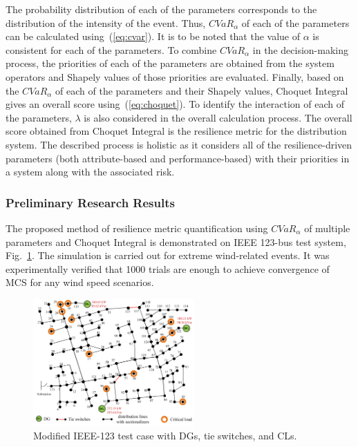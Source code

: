 The probability distribution of each of the parameters corresponds to the distribution of the intensity of the event. Thus, $CVaR_\alpha$ of each of the parameters can be calculated using~(\ref{eq:cvar}). It is to be noted that the value of $\alpha$ is consistent for each of the parameters. To combine $CVaR_\alpha$ in the decision-making process, the priorities of each of the parameters are obtained from the system operators and Shapely values of those priorities are evaluated. Finally, based on the $CVaR_\alpha$ of each of the parameters and their Shapely values, Choquet Integral gives an overall score using~(\ref{eq:choquet}). To identify the interaction of each of the parameters, $\lambda$ is also considered in the overall calculation process. The overall score obtained from Choquet Integral is the resilience metric for the distribution system. The described process is holistic as it considers all of the resilience-driven parameters (both attribute-based and performance-based) with their priorities in a system along with the associated risk.  

\subsubsection{Preliminary Research Results}
The proposed method of resilience metric quantification using $CVaR_\alpha$ of multiple parameters and Choquet Integral is demonstrated on IEEE 123-bus test system, Fig.~\ref{fig:IEEE_123_testcase}. The simulation is carried out for extreme wind-related events. It was experimentally verified that 1000 trials are enough to achieve convergence of MCS for any wind speed scenarios.

\begin{figure}
    \centering
    \includegraphics[width=0.55\textwidth]{figures/IEEE_123_testcase.png}
    \caption{Modified IEEE-123 test case with DGs, tie switches, and CLs.}
    \label{fig:IEEE_123_testcase}
\end{figure}

